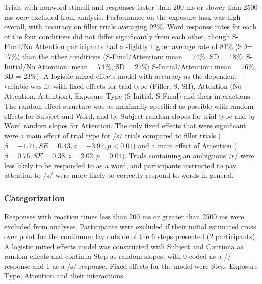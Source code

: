 Trials with nonword stimuli and responses faster than 200 ms or slower than 2500 ms were excluded from analysis. 
Performance on the exposure task was high overall, with accuracy on filler trials averaging 92\%.  
Word response rates for each of the four conditions did not differ significantly from each other, though S-Final/No Attention participants had a slightly higher average rate of 81\% (SD= 17\%) than the other conditions (S-Final/Attention: mean = 74\%, SD = 18\%; S-Initial/No Attention: mean = 74\%, SD = 27\%; S-Initial/Attention: mean = 76\%, SD = 23\%). 
A logistic mixed effects model with accuracy as the dependent variable was fit with fixed effects for trial type (Filler, S, SH), Attention (No Attention, Attention), Exposure Type (S-Initial, S-Final) and their interactions. 
The random effect structure was as maximally specified as possible with random effects for Subject and Word, and by-Subject random slopes for trial type and by-Word random slopes for Attention. 
The only fixed effects that were significant were a main effect of trial type for /s/ trials compared to filler trials ($\beta = -1.71, SE = 0.43, z = -3.97, p < 0.01$) and a main effect of Attention ($\beta = 0.76, SE = 0.38, z = 2.02,   p = 0.04$).  
Trials containing an ambiguous /s/ were less likely to be responded to as a word, and participants instructed to pay attention to /s/ were more likely to correctly respond to words in general.

\subsubsection{Categorization}

Responses with reaction times less than 200 ms or greater than 2500 ms were excluded from analyses. 
Participants were excluded if their initial estimated cross over point for the continuum lay outside of the 6 steps presented (2 participants).  
A logistic mixed effects model was constructed with Subject and Continua as random effects and continua Step as random slopes, with 0 coded as a /\textesh/ response and 1 as a /s/ response.  Fixed effects for the model were Step, Exposure Type, Attention and their interactions.

